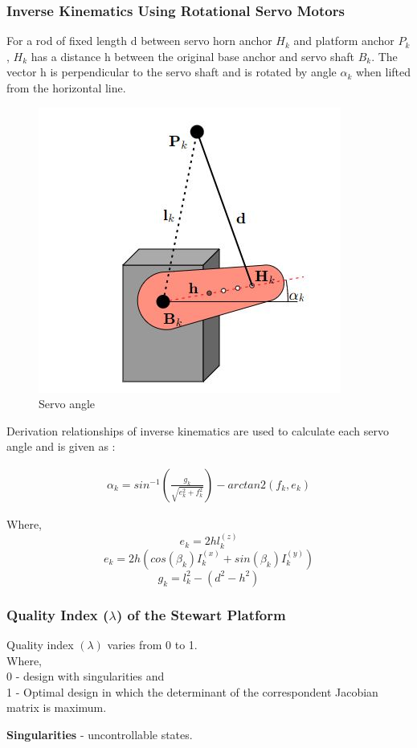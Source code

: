 \subsubsection{Inverse Kinematics Using Rotational Servo Motors}
For a rod of fixed length d between servo horn anchor $H_{k}$ and platform anchor $P_{k}$,  $H_{k}$ has a distance h between the original base anchor and servo shaft $B_{k}$. The vector h is perpendicular to the servo shaft and is rotated by angle $\alpha_{k}$ when lifted from the horizontal line.
\begin{center}
	\begin{figure}[!h]
	\centering
	\includegraphics[width=0.4\linewidth]{Figures/servo}
	\caption[Servo angle]{Servo angle \cite{Eisele_2019}}
	\end{figure}
\end{center}
Derivation relationships of inverse kinematics are used to calculate each servo angle and is given as \cite{Eisele_2019}:
\begin{ceqn}
\begin{align}
	\alpha_{k} = sin^{-1}(\frac{g_{k}}{\sqrt{e_{k}^2+f_{k}^2}})-arctan2(f_{k}, e_{k})
\end{align}
\end{ceqn}
Where,
$$e_{k} = 2hl_{k}^{(z)} $$
$$e_{k} = 2h(cos(\beta_{k})I_{k}^{(x)}+sin({\beta_{k}})I_{k}^(y))$$
$$g_{k} = l_{k}^2 - (d^2 - h^2)   $$

\subsubsection{Quality Index ($\lambda$) of the Stewart Platform}
Quality index $(\lambda)$ varies from 0 to 1.\\
 Where,\\
 0 - design with singularities and\\
 1 - Optimal design in which the determinant of the correspondent Jacobian matrix is maximum.
 
 \textbf{Singularities} - uncontrollable states.
 
